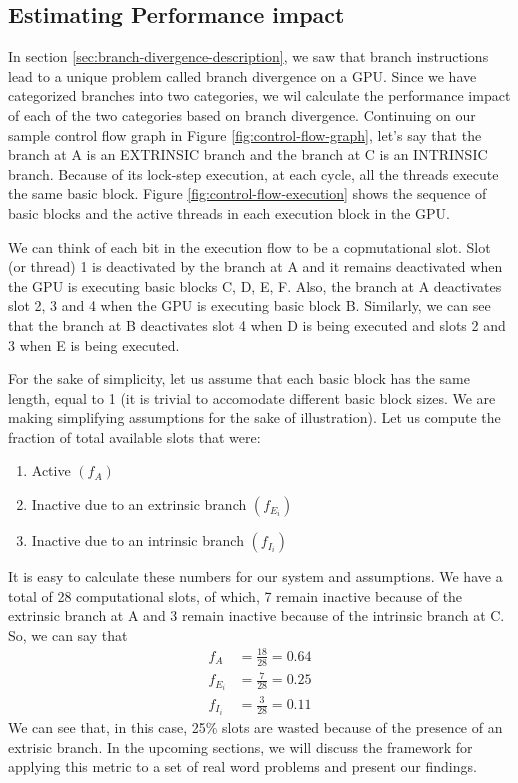 \subsection*{Estimating Performance impact}
\par{In section \ref{sec:branch-divergence-description}, we saw that branch instructions lead to a unique problem called branch divergence on a GPU. Since we have categorized branches into two categories, we wil calculate the performance impact of each of the two categories based on branch divergence. Continuing on our sample control flow graph in Figure \ref{fig:control-flow-graph}, let's say that the branch at A is an EXTRINSIC branch and the branch at C is an INTRINSIC branch. Because of its lock-step execution, at each cycle, all the threads execute the same basic block. Figure \ref{fig:control-flow-execution} shows the sequence of basic blocks and the active threads in each execution block in the GPU.}
\par{We can think of each bit in the execution flow to be a copmutational slot. Slot (or thread) 1 is deactivated by the branch at A and it remains deactivated when the GPU is executing basic blocks C, D, E, F. Also, the branch at A deactivates slot 2, 3 and 4 when the GPU is executing basic block B. Similarly, we can see that the branch at B deactivates slot 4 when D is being executed and slots 2 and 3 when E is being executed.
}
\par{For the sake of simplicity, let us assume that each basic block has the same length, equal to 1 (it is trivial to accomodate different basic block sizes. We are making simplifying assumptions for the sake of illustration). Let us compute the fraction of total available slots that were:}
\begin{enumerate}
	\item Active $(f_{A})$
	\item Inactive due to an extrinsic branch $(f_{E_i})$
	\item Inactive due to an intrinsic branch $(f_{I_i})$
\end{enumerate}
\par{It is easy to calculate these numbers for our system and assumptions. We have a total of 28 computational slots, of which, 7 remain inactive because of the extrinsic branch at A and 3 remain inactive because of the intrinsic branch at C. So, we can say that}
\begin{align*}
	f_{A} 		&= \frac{18}{28} 	= 0.64 \\
	f_{E_{i}} 	&= \frac{7}{28} 	= 0.25 \\
	f_{I_{i}} 	&= \frac{3}{28} 	= 0.11
\end{align*}
We can see that, in this case, 25\% slots are wasted because of the presence of an extrisic branch. In the upcoming sections, we will discuss the framework for applying this metric to a set of real word problems and present our findings.
